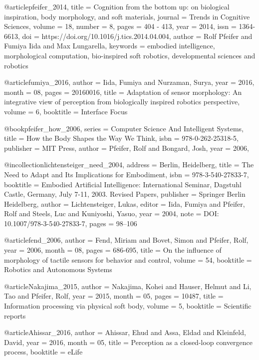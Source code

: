  @article{pfeifer_2014,
 	title = {Cognition from the bottom up: on biological inspiration, body morphology, and soft materials},
 	journal = {Trends in Cognitive Sciences},
 	volume = {18},
 	number = {8},
 	pages = {404 - 413},
 	year = {2014},
 	issn = {1364-6613},
 	doi = {https://doi.org/10.1016/j.tics.2014.04.004},
 	author = {Rolf Pfeifer and Fumiya Iida and Max Lungarella},
 	keywords = {embodied intelligence, morphological computation, bio-inspired soft robotics, developmental sciences and robotics}
 }
 
 @article{fumiya_2016,
 	author = {Iida, Fumiya and Nurzaman, Surya},
 	year = {2016},
 	month = {08},
 	pages = {20160016},
 	title = {Adaptation of sensor morphology: An integrative view of perception from biologically inspired robotics perspective},
 	volume = {6},
 	booktitle = {Interface Focus}
 }
 
 
 @book{pfeifer_how_2006,
 	series = {Computer {Science} {And} {Intelligent} {Systems}},
 	title = {How the {Body} {Shapes} the {Way} {We} {Think}},
 	isbn = {978-0-262-25318-5},
 	publisher = {MIT Press},
 	author = {Pfeifer, Rolf and Bongard, Josh},
 	year = {2006},
 }
 
 @incollection{lichtensteiger_need_2004,
 	address = {Berlin, Heidelberg},
 	title = {The {Need} to {Adapt} and {Its} {Implications} for {Embodiment}},
 	isbn = {978-3-540-27833-7},
 	booktitle = {Embodied {Artificial} {Intelligence}: {International} {Seminar}, {Dagstuhl} {Castle}, {Germany}, {July} 7-11, 2003. {Revised} {Papers}},
 	publisher = {Springer Berlin Heidelberg},
 	author = {Lichtensteiger, Lukas},
 	editor = {Iida, Fumiya and Pfeifer, Rolf and Steels, Luc and Kuniyoshi, Yasuo},
 	year = {2004},
 	note = {DOI: 10.1007/978-3-540-27833-7},
 	pages = {98--106}
 }

@article{fend_2006,
	author = {Fend, Miriam and Bovet, Simon and Pfeifer, Rolf},
	year = {2006},
	month = {08},
	pages = {686-695},
	title = {On the influence of morphology of tactile sensors for behavior and control},
	volume = {54},
	booktitle = {Robotics and Autonomous Systems}
}
 
 @article{Nakajima_2015,
 	author = {Nakajima, Kohei and Hauser, Helmut and Li, Tao and Pfeifer, Rolf},
 	year = {2015},
 	month = {05},
 	pages = {10487},
 	title = {Information processing via physical soft body},
 	volume = {5},
 	booktitle = {Scientific reports}
 }
 
 @article{Ahissar_2016,
 	author = {Ahissar, Ehud and Assa, Eldad and Kleinfeld, David},
 	year = {2016},
 	month = {05},
 	title = {Perception as a closed-loop convergence process},
 	booktitle = {eLife}
 }
 
